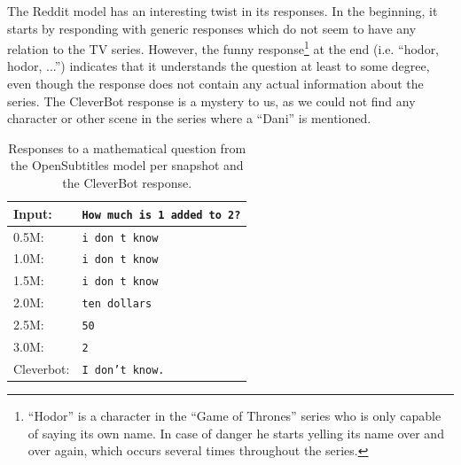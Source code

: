 The Reddit model has an interesting twist in its responses. In the beginning, it starts by responding with generic responses which do not seem to have any relation to the TV series. However, the funny response\footnote{``Hodor'' is a character in the ``Game of Thrones'' series who is only capable of saying its own name. In case of danger he starts yelling its name over and over again, which occurs several times throughout the series.} at the end (i.e. ``hodor, hodor, ...'') indicates that it understands the question at least to some degree, even though the response does not contain any actual information about the series. The CleverBot response is a mystery to us, as we could not find any character or other scene in the series where a ``Dani'' is mentioned.
\\
\begin{table}[H]
	\centering
	\begin{adjustbox}{max width=\textwidth}
		\begin{tabularx}{\textwidth}{lX}
			\toprule
			Input: 	& \texttt{How much is 1 added to 2?}\\
			\midrule
			0.5M: 	& \texttt{i don t know}\\
			1.0M: 	& \texttt{i don t know}\\
			1.5M:	& \texttt{i don t know}\\
			2.0M:	& \texttt{ten dollars}\\
			2.5M:	& \texttt{50}\\
			3.0M:	& \texttt{2}\\
			Cleverbot:	& \texttt{I don't know.}\\
			\bottomrule
		\end{tabularx}
	\end{adjustbox}
	\caption{Responses to a mathematical question from the OpenSubtitles model per snapshot and the CleverBot response.}
	\label{results:example5_output:OpenSubtitle_compared}
\end{table}
